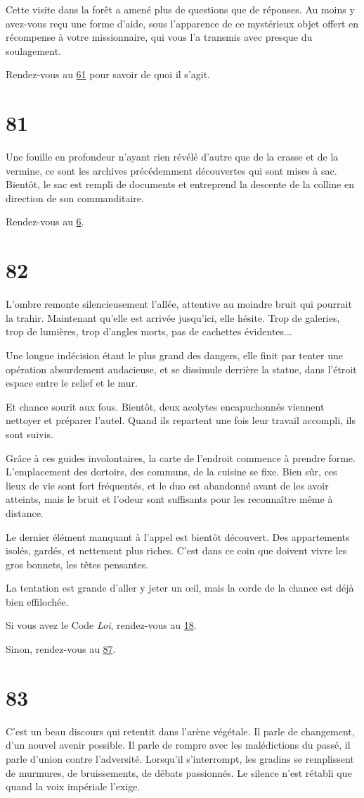 \documentclass{report}
\newcommand{\gsection}[1]{
    \section{#1}
    \label{section-#1}
}
\newcommand{\glink}[1]{\hyperref[section-#1]{#1}}
\begin{document}
Cette visite dans la forêt a amené plus de questions que de réponses. Au moins y avez-vous reçu une forme d'aide, sous l'apparence de ce mystérieux objet offert en récompense à votre missionnaire, qui vous l'a transmis avec presque du soulagement.

Rendez-vous au \glink{61} pour savoir de quoi il s'agit.

\gsection{81}

Une fouille en profondeur n'ayant rien révélé d'autre que de la crasse et de la vermine, ce sont les archives précédemment découvertes qui sont mises à sac. Bientôt, le sac est rempli de documents et entreprend la descente de la colline en direction de son commanditaire.

Rendez-vous au \glink{6}.

\gsection{82}

L'ombre remonte silencieusement l'allée, attentive au moindre bruit qui pourrait la trahir. Maintenant qu'elle est arrivée jusqu'ici, elle hésite. Trop de galeries, trop de lumières, trop d'angles morts, pas de cachettes évidentes...

Une longue indécision étant le plus grand des dangers, elle finit par tenter une opération absurdement audacieuse, et se dissimule derrière la statue, dans l'étroit espace entre le relief et le mur.

Et chance sourit aux fous. Bientôt, deux acolytes encapuchonnés viennent nettoyer et préparer l'autel. Quand ils repartent une fois leur travail accompli, ils sont suivis.

Grâce à ces guides involontaires, la carte de l'endroit commence à prendre forme. L'emplacement des dortoirs, des communs, de la cuisine se fixe. Bien sûr, ces lieux de vie sont fort fréquentés, et le duo est abandonné avant de les avoir atteints, mais le bruit et l'odeur sont suffisants pour les reconnaître même à distance.

Le dernier élément manquant à l'appel est bientôt découvert. Des appartements isolés, gardés, et nettement plus riches. C'est dans ce coin que doivent vivre les gros bonnets, les têtes pensantes.

La tentation est grande d'aller y jeter un œil, mais la corde de la chance est déjà bien effilochée. 

Si vous avez le Code \emph{Loi}, rendez-vous au \glink{18}.

Sinon, rendez-vous au \glink{87}.

\gsection{83}

C'est un beau discours qui retentit dans l'arène végétale. Il parle de changement, d'un nouvel avenir possible. Il parle de rompre avec les malédictions du passé, il parle d'union contre l'adversité. Lorsqu'il s'interrompt, les gradins se remplissent de murmures, de bruissements, de débats passionnés. Le silence n'est rétabli que quand la voix impériale l'exige.
\end{document}
